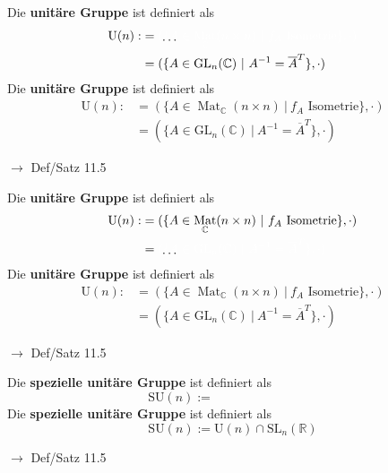 \documentclass[11pt]{article}
\renewcommand{\cite}[1]{\par\bigskip\hfill{\color{gray}\tiny\(\to\) #1}}
\newcommand{\CC}{\mathbb{C}}
\newcommand{\RR}{\mathbb{R}}
\DeclareMathOperator{\Mat}{Mat}
\newcommand{\hide}[1]{\parbox{0cm}{\raisebox{-7pt}[0cm]{\dots}}\color{white}#1\color{black}}
\let\olddots\dots
\renewcommand{\dots}{\,\olddots\,}
\newenvironment{field}{}{\newpage}
\newif\ifnote
\newenvironment{note}{\notetrue}{\notefalse}
\newcommand{\localtag}{}
\newcommand{\globaltag}{}
\newcommand{\uuid}{}
\newcommand{\tags}[1]{
    \ifnote
        \renewcommand{\localtag}{#1}
    \else
        \renewcommand{\globaltag}{#1}
    \fi
    }
\newcommand{\xplain}[1]{\renewcommand{\uuid}{#1}}
\begin{document}
\begin{note}
    \tags{Def Satz}
    \xplain{a0b73478-c30d-11ec-9d64-0242ac120002}
    \begin{field}
        Die \textbf{unitäre Gruppe} ist definiert als
        \begin{align*}
            \text{U}(n) :&= \hide{(\{A\in\Mat_{\CC}(n\times n) \ \vert \ f_A \text{ Isometrie}\}, \cdot)}\\
            &= (\{A \in \text{GL}_n(\CC) \ \vert \ A^{-1} = \overline{A}^T\}, \cdot)
        \end{align*}
    \end{field}
    \begin{field}
        Die \textbf{unitäre Gruppe} ist definiert als
        \begin{align*}
            \text{U}(n) :&= (\{A\in\Mat_{\CC}(n\times n) \ \vert \ f_A \text{ Isometrie}\}, \cdot)\\
            &= (\{A \in \text{GL}_n(\CC) \ \vert \ A^{-1} = \overline{A}^T\}, \cdot)
        \end{align*}
        \cite{Def/Satz 11.5}
    \end{field}

    \begin{field}
        Die \textbf{unitäre Gruppe} ist definiert als
        \begin{align*}
            \text{U}(n) :&= (\{A\in\Mat_{\CC}(n\times n) \ \vert \ f_A \text{ Isometrie}\}, \cdot)\\
            &= \hide{(\{A \in \text{GL}_n(\CC) \ \vert \ A^{-1} = \overline{A}^T\}, \cdot)}
        \end{align*}
    \end{field}
    \begin{field}
        Die \textbf{unitäre Gruppe} ist definiert als
        \begin{align*}
            \text{U}(n) :&= (\{A\in\Mat_{\CC}(n\times n) \ \vert \ f_A \text{ Isometrie}\}, \cdot)\\
            &= (\{A \in \text{GL}_n(\CC) \ \vert \ A^{-1} = \overline{A}^T\}, \cdot)
        \end{align*}
        \cite{Def/Satz 11.5}
    \end{field}

    \begin{field}
        Die \textbf{spezielle unitäre Gruppe} ist definiert als
        \[\text{SU}(n) := \phantom{\text{U}(n) \cap \text{SL}_n(\CC)}\]
    \end{field}
    \begin{field}
        Die \textbf{spezielle unitäre Gruppe} ist definiert als
        \[\text{SU}(n) := \text{U}(n) \cap \text{SL}_n(\RR)\]
        \cite{Def/Satz 11.5}
    \end{field}
\end{note}
\end{document}
